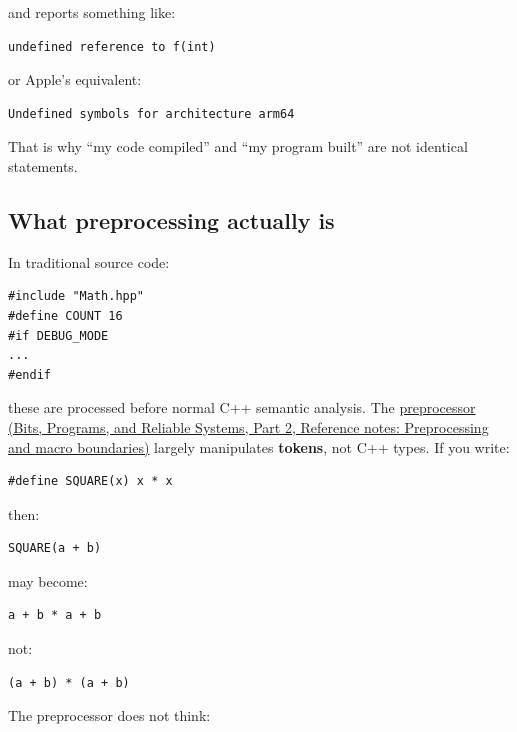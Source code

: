 and reports something like:

\begin{verbatim}
undefined reference to f(int)
\end{verbatim}

or Apple's equivalent:

\begin{verbatim}
Undefined symbols for architecture arm64
\end{verbatim}

That is why ``my code compiled'' and ``my program built'' are not identical statements.

\subsection{What preprocessing actually is}\label{05-engine-i-ch002-what-preprocessing-actually-is}

\hypertarget{05-engine-i-ch002-what-preprocessing-actually-is}{}

In traditional source code:

\begin{verbatim}
#include "Math.hpp"
#define COUNT 16
#if DEBUG_MODE
...
#endif
\end{verbatim}

these are processed before normal C++ semantic analysis. The \href{../01-Bits-Programs-and-Reliable-Systems-P02/main.pdf\#nameddest=appendix-33c0a92ce855}{preprocessor (Bits, Programs, and Reliable Systems, Part 2, Reference notes: Preprocessing and macro boundaries)} largely manipulates \textbf{tokens}, not C++ types. If you write:

\begin{verbatim}
#define SQUARE(x) x * x
\end{verbatim}

then:

\begin{verbatim}
SQUARE(a + b)
\end{verbatim}

may become:

\begin{verbatim}
a + b * a + b
\end{verbatim}

not:

\begin{verbatim}
(a + b) * (a + b)
\end{verbatim}

The preprocessor does not think:

